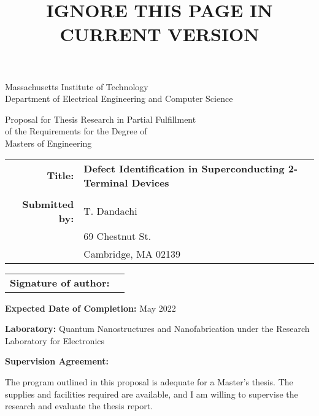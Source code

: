 \documentclass{article}
\title{IGNORE THIS PAGE IN CURRENT VERSION}
\begin{document}
\maketitle

\begin{center}
    Massachusetts Institute of Technology \\
    Department of Electrical Engineering and Computer Science
\end{center}

\begin{center}
    Proposal for Thesis Research in Partial Fulfillment\\ of the Requirements for the Degree of\\
Masters of Engineering
\end{center}

\vfill

\begin{tabular}{rl}
\textbf{Title:} & \textbf{Defect Identification in Superconducting 2-Terminal Devices} \\
\\
\textbf{Submitted by:} & T. Dandachi \\
              & 69 Chestnut St. \\
              & Cambridge, MA 02139
\end{tabular}

\vspace{15mm}
\begin{tabular}{@{}p{1.5in}p{4in}@{}}
\textbf{Signature of author:} & \hrulefill \\
\end{tabular}

\vfill

\textbf{Expected Date of Completion:} May 2022

\vfill

\textbf{Laboratory:} Quantum Nanostructures and Nanofabrication under the Research Laboratory for Electronics




\vfill

\textbf{Supervision Agreement:}

The program outlined in this proposal is adequate for a Master's thesis. The supplies and facilities required are available, and I am willing to supervise the research and evaluate the thesis report.
\end{document}
